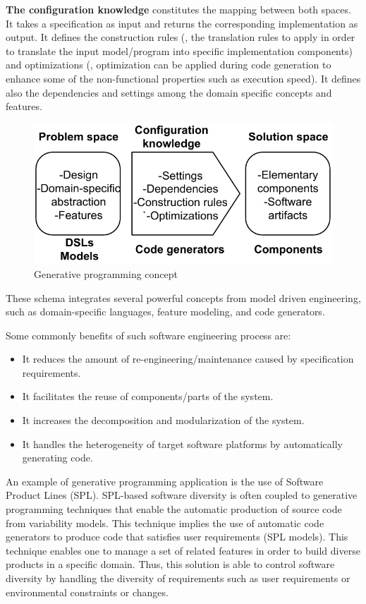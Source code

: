 \textbf{The configuration knowledge} constitutes the mapping between both spaces. It takes a specification as input and returns the corresponding implementation as output. It defines the construction rules (\ie, the translation rules to apply in order to translate the input model/program into specific implementation components) and optimizations (\ie, optimization can be applied during code generation to enhance some of the non-functional properties such as execution speed). It defines also the dependencies and settings among the domain specific concepts and features.

\begin{figure}[h]
	\center
	\includegraphics[scale=0.65]{Background/fig/GDM.pdf}
	\caption{Generative programming concept}
	\label{fig:GDM}
\end{figure}
These schema integrates several powerful concepts from model driven engineering, such as domain-specific languages, feature modeling, and code generators.

Some commonly benefits of such software engineering process are:
\begin{itemize}
\item It reduces the amount of re-engineering/maintenance caused by specification requirements.
\item It facilitates the reuse of components/parts of the system.
\item It increases the decomposition and modularization of the system.
\item It handles the heterogeneity of target software platforms by automatically generating code.
\end{itemize}

An example of generative programming application is the use of Software Product Lines (SPL)\cite{schaefer2012software}.
SPL-based software diversity is often coupled to generative programming techniques\cite{Czarnecki:2000:GPM:345203} that enable the automatic production of source code from variability models. This technique implies the use of automatic code generators to produce code that satisfies user requirements (SPL models).
This technique enables one to manage a set of related features in order to build diverse products in a specific domain. Thus, this solution is able to control software diversity by handling the diversity of requirements such as user requirements or environmental constraints or changes. 


